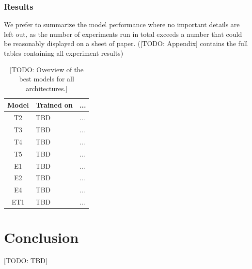 \subsubsection{Results}
\label{ssst:experimental_results}
We prefer to summarize the model performance where no important details are left out, as the number of experiments run in total exceeds a number that could be reasonably displayed on a sheet of paper. ([TODO: Appendix] contains the full tables containing all experiment results)

\begin{landscape}
  \begin{table}[h]
    \begin{tabularx}{\linewidth}{|c|X|X|}
      \hline
      Model & Trained on & ... \\
      \hline
      T2 & TBD & ... \\
      T3 & TBD & ... \\
      T4 & TBD & ... \\
      T5 & TBD & ... \\
      E1 & TBD & ... \\
      E2 & TBD & ... \\
      E4 & TBD & ... \\
      ET1 & TBD & ... \\
      \hline
    \end{tabularx}
    \caption{[TODO: Overview of the best models for all architectures.]}
    \label{tab:experimental_results}
  \end{table}
\end{landscape}

\clearpage
\section{Conclusion}
[TODO: TBD]
